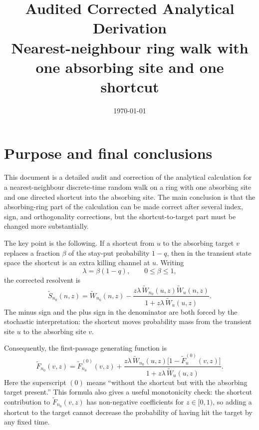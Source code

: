 \documentclass[11pt]{article}
\title{Audited Corrected Analytical Derivation\\
Nearest-neighbour ring walk with one absorbing site and one shortcut}
\author{}
\date{\today}
\newcommand{\wt}{\widetilde}
\begin{document}
\maketitle

\tableofcontents

\section{Purpose and final conclusions}

This document is a detailed audit and correction of the analytical calculation for a
nearest-neighbour discrete-time random walk on a ring with one absorbing site and one directed
shortcut into the absorbing site.  The main conclusion is that the absorbing-ring part of the
calculation can be made correct after several index, sign, and orthogonality corrections, but the
shortcut-to-target part must be changed more substantially.

The key point is the following.  If a shortcut from $u$ to the absorbing target $v$ replaces a
fraction $\beta$ of the stay-put probability $1-q$, then in the transient state space the shortcut is
an extra killing channel at $u$.  Writing
\begin{equation}
  \lambda=\beta(1-q),\qquad 0\leq \beta\leq 1,
\end{equation}
the corrected resolvent is
\begin{equation}
  \boxed{
  \wt S_{n_0}(n,z)=\wt W_{n_0}(n,z)
  -\frac{z\lambda\,\wt W_{n_0}(u,z)\wt W_u(n,z)}
  {1+z\lambda\,\wt W_u(u,z)}.}
  \label{eq:main-corrected-resolvent}
\end{equation}
The minus sign and the plus sign in the denominator are both forced by the stochastic
interpretation: the shortcut moves probability mass from the transient site $u$ to the absorbing
site $v$.

Consequently, the first-passage generating function is
\begin{equation}
  \boxed{
  \wt F_{n_0}(v,z)=\wt F^{(0)}_{n_0}(v,z)+
  \frac{z\lambda\,\wt W_{n_0}(u,z)\bigl[1-\wt F^{(0)}_u(v,z)\bigr]}
  {1+z\lambda\,\wt W_u(u,z)}.}
  \label{eq:main-corrected-F}
\end{equation}
Here the superscript $(0)$ means ``without the shortcut but with the absorbing target present.''
This formula also gives a useful monotonicity check: the shortcut contribution to
$\wt F_{n_0}(v,z)$ has non-negative coefficients for $z\in[0,1)$, so adding a shortcut to the
target cannot decrease the probability of having hit the target by any fixed time.
\end{document}
